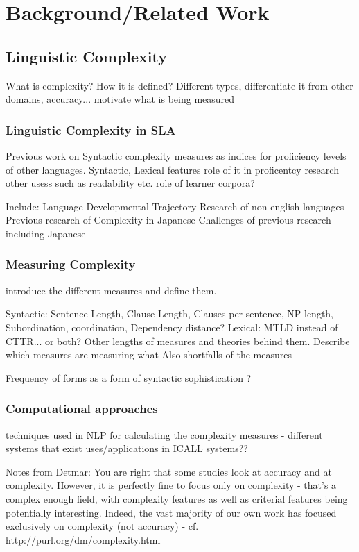 \chapter{Background/Related Work}

\section{Linguistic Complexity}
What is complexity? How it is defined? Different types, differentiate it from other domains, accuracy...
motivate what is being measured


\subsection{Linguistic Complexity in SLA}
Previous work on Syntactic complexity measures as indices for proficiency levels of other languages.
Syntactic, Lexical features
role of it in proficentcy research
other usess such as readability etc.
role of learner corpora?

Include:
Language Developmental Trajectory
Research of non-english languages
Previous research of Complexity in Japanese
Challenges of previous research - including Japanese


\subsection{Measuring Complexity}
introduce the different measures and define them.

Syntactic:
Sentence Length, Clause Length, Clauses per sentence, NP length, Subordination, coordination, Dependency distance?
Lexical:
MTLD instead of CTTR... or both?
Other lengths of measures and theories behind them. Describe which measures are measuring what Also shortfalls of the
measures


Frequency of forms as a form of syntactic sophistication ? \cite{Ellis2004}
%

\subsection{Computational approaches}
techniques used in NLP for calculating the complexity measures - different systems that exist
uses/applications in ICALL systems??




Notes from Detmar:
You are right that some studies look at accuracy and at
complexity. However, it is perfectly fine to focus only on complexity
- that's a complex enough field, with complexity features as well as
criterial features being potentially interesting. Indeed, the vast
majority of our own work has focused exclusively on complexity (not
accuracy) - cf. http://purl.org/dm/complexity.html

